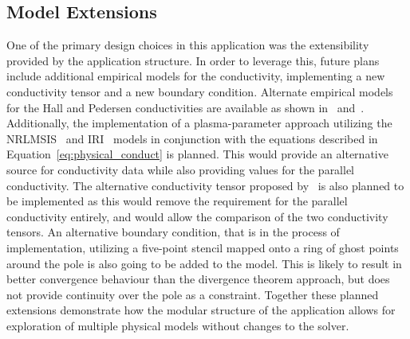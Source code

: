 \subsection{Model Extensions}
One of the primary design choices in this application was the extensibility provided by the application structure. In order to leverage this, future plans include additional empirical models for the conductivity, implementing a new conductivity tensor and a new boundary condition. Alternate empirical models for the Hall and Pedersen conductivities are available as shown in~\citet{cousins2015} and~\citet{local_laundal_2022}. Additionally, the implementation of a plasma-parameter approach utilizing the NRLMSIS~\citep{nrlmsis_emmert_2020} and IRI~\citep{international_bilitza_2022} models in conjunction with the equations described in Equation~\ref{eq:physical_conduct} is planned. This would provide an alternative source for conductivity data while also providing values for the parallel conductivity. The alternative conductivity tensor proposed by~\citet{goodman1995} is also planned to be implemented as this would remove the requirement for the parallel conductivity entirely, and would allow the comparison of the two conductivity tensors. An alternative boundary condition, that is in the process of implementation, utilizing a five-point stencil mapped onto a ring of ghost points around the pole is also going to be added to the model. This is likely to result in better convergence behaviour than the divergence theorem approach, but does not provide continuity over the pole as a constraint. Together these planned extensions demonstrate how the modular structure of the application allows for exploration of multiple physical models without changes to the solver.

